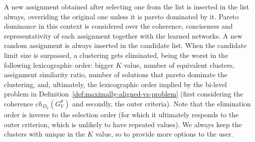 \documentclass{ecai}
\begin{document}
A new assignment obtained after selecting one from the list is inserted in the list always, overriding the original one unless it is pareto dominated by it. Pareto dominance in this context is considered over the coherence, conciseness and representativity of each assignment together with the learned networks. A new random assignment is always inserted in the candidate list. When the candidate limit size is surpassed, a clustering gets eliminated, being the worst in the following lexicographic order: bigger $K$ value, number of equivalent clusters, assignment similarity ratio, number of solutions that pareto dominate the clustering, and, ultimately, the lexicographic order implied by the bi-level problem in Definition~\ref{def:maximally-aligned-vs-problem} (first considering the coherence $ch_{D_V}({G_V^\theta})$ and secondly, the outer criteria). Note that the elimination order is inverse to the selection order (for which it ultimately responds to the outer criterion, which is unlikely to have repeated values). We always keep the clusters with unique in the $K$ value, so to provide more options to the user.


\end{document}
